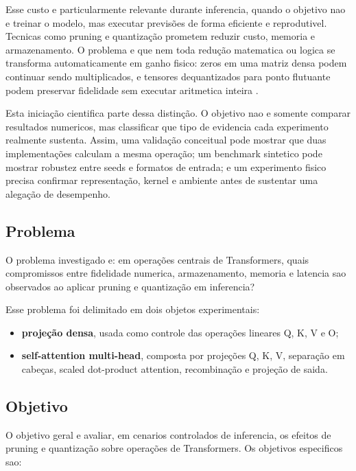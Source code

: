 \documentclass[12pt, a4paper]{article}
\begin{document}
Esse custo e particularmente relevante durante inferencia, quando o objetivo
nao e treinar o modelo, mas executar previs\~oes de forma eficiente e
reprodutivel. Tecnicas como pruning e quantiza\c{c}\~ao prometem reduzir custo,
memoria e armazenamento. O problema e que nem toda redu\c{c}\~ao matematica ou
logica se transforma automaticamente em ganho fisico: zeros em uma matriz densa
podem continuar sendo multiplicados, e tensores dequantizados para ponto
flutuante podem preservar fidelidade sem executar aritmetica inteira
\cite{han2015learning,jacob2018quantization,dettmers2022llmint8}.

Esta inicia\c{c}\~ao cientifica parte dessa distin\c{c}\~ao. O objetivo nao e
somente comparar resultados numericos, mas classificar que tipo de evidencia
cada experimento realmente sustenta. Assim, uma valida\c{c}\~ao conceitual pode
mostrar que duas implementa\c{c}\~oes calculam a mesma opera\c{c}\~ao; um
benchmark sintetico pode mostrar robustez entre seeds e formatos de entrada; e
um experimento fisico precisa confirmar representa\c{c}\~ao, kernel e ambiente
antes de sustentar uma alega\c{c}\~ao de desempenho.

\subsection{Problema}

O problema investigado e: em opera\c{c}\~oes centrais de Transformers, quais
compromissos entre fidelidade numerica, armazenamento, memoria e latencia sao
observados ao aplicar pruning e quantiza\c{c}\~ao em inferencia?

Esse problema foi delimitado em dois objetos experimentais:

\begin{itemize}
  \item \textbf{proje\c{c}\~ao densa}, usada como controle das opera\c{c}\~oes
  lineares Q, K, V e O;
  \item \textbf{self-attention multi-head}, composta por proje\c{c}\~oes Q, K,
  V, separa\c{c}\~ao em cabe\c{c}as, scaled dot-product attention,
  recombina\c{c}\~ao e proje\c{c}\~ao de saida.
\end{itemize}

\subsection{Objetivo}

O objetivo geral e avaliar, em cenarios controlados de inferencia, os efeitos
de pruning e quantiza\c{c}\~ao sobre opera\c{c}\~oes de Transformers. Os
objetivos especificos sao:
\end{document}
